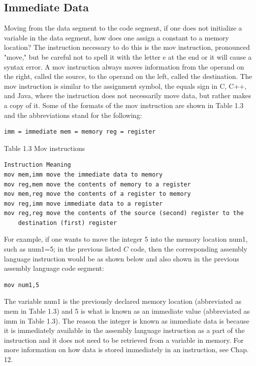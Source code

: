 \documentclass[10pt]{book}
\begin{document}
\subsection{Immediate Data}
Moving from the data segment to the code segment, if one does not initialize a variable in the data segment, how does one assign a constant to a memory location? The instruction necessary to do this is the mov instruction, pronounced "move," but be careful not to spell it with the letter e at the end or it will cause a syntax error. A mov instruction always moves information from the operand on the right, called the source, to the operand on the left, called the destination. The mov instruction is similar to the assignment symbol, the equals sign in C, C++, and Java, where the instruction does not necessarily move data, but rather makes a copy of it. Some of the formats of the mov instruction are shown in Table 1.3 and the abbreviations stand for the following:

\begin{verbatim}
imm = immediate mem = memory reg = register
\end{verbatim}

Table 1.3 Mov instructions

\begin{verbatim}
Instruction Meaning
mov mem,imm move the immediate data to memory
mov reg,mem move the contents of memory to a register
mov mem,reg move the contents of a register to memory
mov reg,imm move immediate data to a register
mov reg,reg move the contents of the source (second) register to the
    destination (first) register
\end{verbatim}

For example, if one wants to move the integer 5 into the memory location num1, such as num1=5; in the previous listed $C$ code, then the corresponding assembly language instruction would be as shown below and also shown in the previous assembly language code segment:

\begin{verbatim}
mov num1,5
\end{verbatim}

The variable num1 is the previously declared memory location (abbreviated as mem in Table 1.3) and 5 is what is known as an immediate value (abbreviated as imm in Table 1.3). The reason the integer is known as immediate data is because it is immediately available in the assembly language instruction as a part of the instruction and it does not need to be retrieved from a variable in memory. For more information on how data is stored immediately in an instruction, see Chap. 12.
\end{document}
